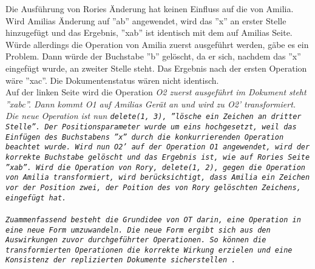 Die Ausführung von Rories Änderung hat keinen Einfluss auf die von Amilia.
Wird Amilias Änderung auf ''ab'' angewendet, wird das ''x'' an erster Stelle hinzugefügt und das Ergebnis, ''xab'' ist identisch mit dem auf Amilias Seite.\\
%
Würde allerdings die Operation von Amilia zuerst ausgeführt werden, gäbe es ein Problem.
Dann würde der Buchstabe ''b'' gelöscht, da er sich, nachdem das ''x'' eingefügt wurde, an zweiter Stelle steht.
Das Ergebnis nach der ersten Operation wäre ''xac''. Die Dokumentenstatus wären nicht identisch.\\
%
Auf der linken Seite wird die Operation \it{O2} zuerst ausgeführt im Dokument steht ''xabc''.
Dann kommt \it{O1} auf Amilias Gerät an und wird zu \it{O2'} transformiert. Die neue Operation ist nun \tt{delete(1, 3)}, ''lösche ein Zeichen an dritter Stelle''. Der Positionsparameter wurde um eins hochgesetzt, weil das Einfügen des Buchstabens ''x'' durch die konkurrierenden Operation beachtet wurde.
Wird nun \it{O2'} auf der Operation \it{O1} angewendet, wird der korrekte Buchstabe gelöscht und das Ergebnis ist, wie auf Rories Seite ''xab''.
Wird die Operation von Rory, \tt{delete(1, 2)}, gegen die Operation von Amilia transformiert, wird berücksichtigt, dass Amilia ein Zeichen vor der Position zwei, der Poition des von Rory gelöschten Zeichens, eingefügt hat.\\\\
%
%
Zuammenfassend besteht die Grundidee von \gls{OT} darin, eine Operation in eine neue Form umzuwandeln.
Die neue Form ergibt sich aus den Auswirkungen zuvor durchgeführter Operationen.
So können die transformierten Operationen die korrekte Wirkung erzielen und eine Konsistenz der replizierten Dokumente sicherstellen~\cite{ot-later}.
%
%
